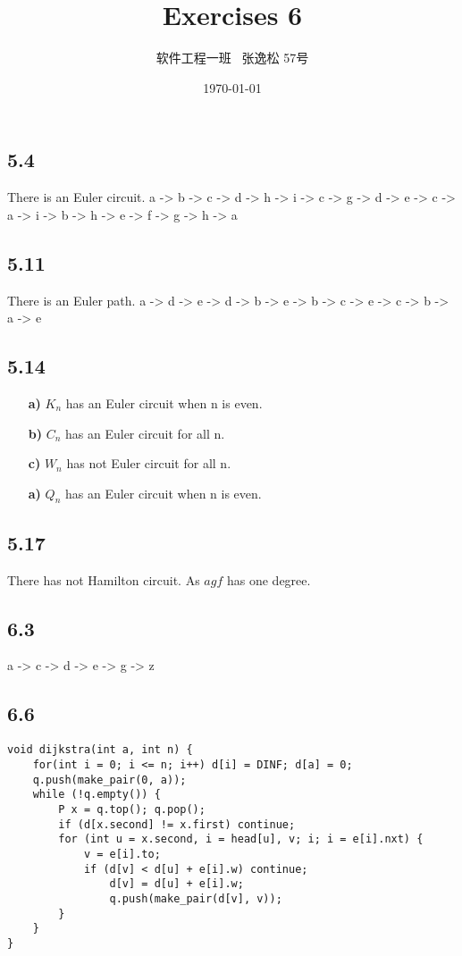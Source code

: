\documentclass[10pt]{ctexart}
\title{Exercises 6}
\author{软件工程一班 \ 张逸松 57号}
\date{\today}
\begin{document}
    \maketitle
    \subsection*{5.4}
    There is an Euler circuit.
    a -> b -> c -> d -> h -> i -> c -> g -> d -> e -> c -> a -> i -> b -> h -> e -> f -> g -> h -> a
    \subsection*{5.11}
    There is an Euler path.
    a -> d -> e -> d -> b -> e -> b -> c -> e -> c -> b -> a -> e
    \subsection*{5.14}
    \begin{itemize}
        \item [\textbf{a)}] $K_n$ has an Euler circuit when n is even.
        \item [\textbf{b)}] $C_n$ has an Euler circuit for all n.
        \item [\textbf{c)}] $W_n$ has not Euler circuit for all n.
        \item [\textbf{a)}] $Q_n$ has an Euler circuit when n is even.
    \end{itemize}
    \subsection*{5.17}
    There has not Hamilton circuit. As $a g f$ has one degree.
    \subsection*{6.3}
    a -> c -> d -> e -> g -> z
    \subsection*{6.6}
\begin{lstlisting}
void dijkstra(int a, int n) {
    for(int i = 0; i <= n; i++) d[i] = DINF; d[a] = 0;
    q.push(make_pair(0, a));
    while (!q.empty()) {
        P x = q.top(); q.pop();
        if (d[x.second] != x.first) continue; 
        for (int u = x.second, i = head[u], v; i; i = e[i].nxt) {
            v = e[i].to;
            if (d[v] < d[u] + e[i].w) continue;
                d[v] = d[u] + e[i].w;
                q.push(make_pair(d[v], v));
        }
    }
}
\end{lstlisting}
\end{document}
